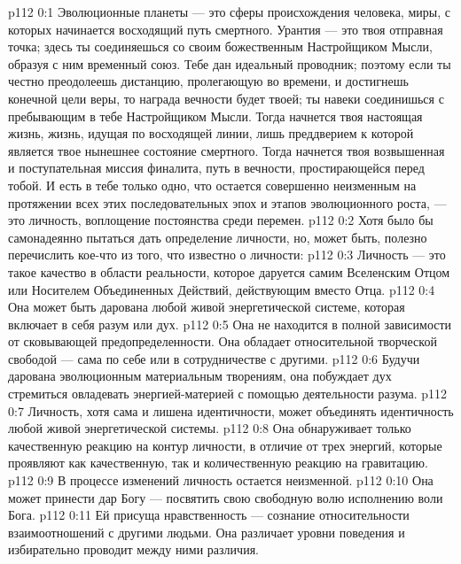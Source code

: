 \author{Одиночный Вестник}
\vs p112 0:1 Эволюционные планеты --- это сферы происхождения человека, миры, с которых начинается восходящий путь смертного. Урантия --- это твоя отправная точка; здесь ты соединяешься со своим божественным Настройщиком Мысли, образуя с ним временный союз. Тебе дан идеальный проводник; поэтому если ты честно преодолеешь дистанцию, пролегающую во времени, и достигнешь конечной цели веры, то награда вечности будет твоей; ты навеки соединишься с пребывающим в тебе Настройщиком Мысли. Тогда начнется твоя настоящая жизнь, жизнь, идущая по восходящей линии, лишь преддверием к которой является твое нынешнее состояние смертного. Тогда начнется твоя возвышенная и поступательная миссия финалита, путь в вечности, простирающейся перед тобой. И есть в тебе только одно, что остается совершенно неизменным на протяжении всех этих последовательных эпох и этапов эволюционного роста, --- это личность, воплощение постоянства среди перемен.
\vs p112 0:2 \pc Хотя было бы самонадеянно пытаться дать определение личности, но, может быть, полезно перечислить кое\hyp{}что из того, что известно о личности:
\vs p112 0:3 \bibnobreakspace Личность --- это такое качество в области реальности, которое даруется самим Вселенским Отцом или Носителем Объединенных Действий, действующим вместо Отца.
\vs p112 0:4 \pc {}\bibnobreakspace Она может быть дарована любой живой энергетической системе, которая включает в себя разум или дух.
\vs p112 0:5 \pc {}\bibnobreakspace Она не находится в полной зависимости от сковывающей предопределенности. Она обладает относительной творческой свободой --- сама по себе или в сотрудничестве с другими.
\vs p112 0:6 \pc {}\bibnobreakspace Будучи дарована эволюционным материальным творениям, она побуждает дух стремиться овладевать энергией\hyp{}материей с помощью деятельности разума.
\vs p112 0:7 \pc {}\bibnobreakspace Личность, хотя сама и лишена идентичности, может объединять идентичность любой живой энергетической системы.
\vs p112 0:8 \pc {}\bibnobreakspace Она обнаруживает только качественную реакцию на контур личности, в отличие от трех энергий, которые проявляют как качественную, так и количественную реакцию на гравитацию.
\vs p112 0:9 \pc {}\bibnobreakspace В процессе изменений личность остается неизменной.
\vs p112 0:10 \pc {}\bibnobreakspace Она может принести дар Богу --- посвятить свою свободную волю исполнению воли Бога.
\vs p112 0:11 \pc {}\bibnobreakspace Ей присуща нравственность --- сознание относительности взаимоотношений с другими людьми. Она различает уровни поведения и избирательно проводит между ними различия.
